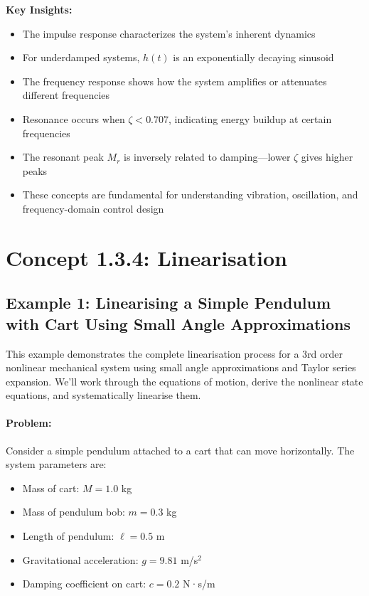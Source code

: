 \documentclass[11pt,a4paper]{article}
\begin{document}
\textbf{Key Insights:}
\begin{itemize}
\item The impulse response characterizes the system's inherent dynamics
\item For underdamped systems, $h(t)$ is an exponentially decaying sinusoid
\item The frequency response shows how the system amplifies or attenuates different frequencies
\item Resonance occurs when $\zeta < 0.707$, indicating energy buildup at certain frequencies
\item The resonant peak $M_r$ is inversely related to damping—lower $\zeta$ gives higher peaks
\item These concepts are fundamental for understanding vibration, oscillation, and frequency-domain control design
\end{itemize}

\section{Concept 1.3.4: Linearisation}

\subsection{Example 1: Linearising a Simple Pendulum with Cart Using Small Angle Approximations}

This example demonstrates the complete linearisation process for a 3rd order nonlinear mechanical system using small angle approximations and Taylor series expansion. We'll work through the equations of motion, derive the nonlinear state equations, and systematically linearise them.

\paragraph{Problem:}
Consider a simple pendulum attached to a cart that can move horizontally. The system parameters are:
\begin{itemize}
\item Mass of cart: $M = 1.0$ kg
\item Mass of pendulum bob: $m = 0.3$ kg
\item Length of pendulum: $\ell = 0.5$ m
\item Gravitational acceleration: $g = 9.81$ m/s$^2$
\item Damping coefficient on cart: $c = 0.2$ N·s/m
\end{itemize}
\end{document}
